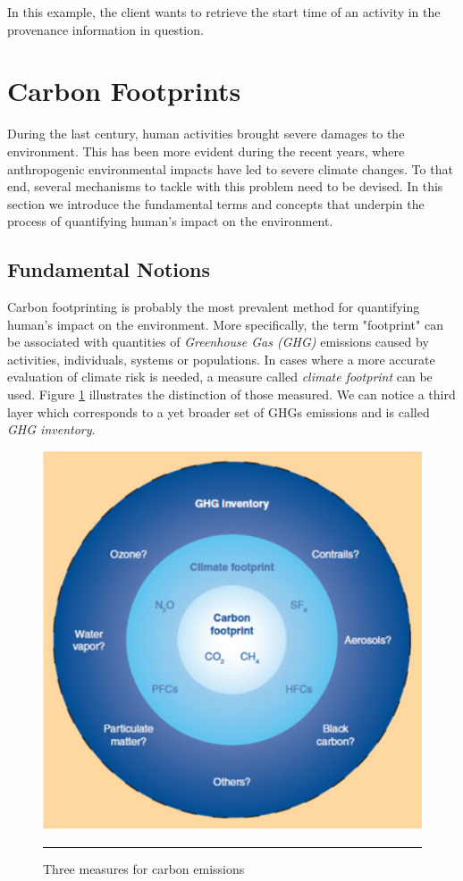 In this example, the client wants to retrieve the start time of an activity in the provenance information in question.

\section{Carbon Footprints}

During the last century, human activities brought severe damages to the environment. This has been more evident during the recent years, where anthropogenic environmental impacts have led to severe climate changes\cite{reference23:1}. To that end, several mechanisms to tackle with this problem need to be devised. In this section we introduce the fundamental terms and concepts that underpin the process of quantifying human's impact on the environment.

\subsection{Fundamental Notions}

Carbon footprinting is probably the most prevalent method for quantifying human's impact on the environment. More specifically, the term "footprint" can be associated with quantities of \emph{Greenhouse Gas (GHG)} emissions\cite{ghg} caused by activities, individuals, systems or populations. In cases where a more accurate evaluation of climate risk is needed, a measure called \emph{climate footprint}\cite{reference23:3} can be used. Figure \ref{fig:ghgEmissionMeasures} illustrates the distinction of those measured. We can notice a third layer which corresponds to a yet broader set of GHGs emissions and is called \emph{GHG inventory}.

\begin{figure}[htbp]
	\centering
		\includegraphics{./Figures/figure16.pdf}
		\rule{35em}{0.5pt}
	\caption[Carbon Emissions Measures]{Three measures for carbon emissions\cite{reference23}}
	\label{fig:ghgEmissionMeasures}
\end{figure}

